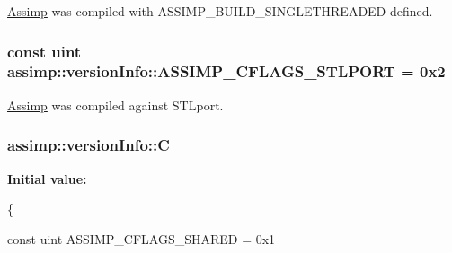 \hyperlink{class_assimp}{Assimp} was compiled with A\+S\+S\+I\+M\+P\+\_\+\+B\+U\+I\+L\+D\+\_\+\+S\+I\+N\+G\+L\+E\+T\+H\+R\+E\+A\+D\+E\+D defined. \hypertarget{namespaceassimp_1_1version_info_a9ff059f28d8b2ae886b672abf7ae0d4b}{
\subsubsection[{A\+S\+S\+I\+M\+P\+\_\+\+C\+F\+L\+A\+G\+S\+\_\+\+S\+T\+L\+P\+O\+R\+T}]{\setlength{\rightskip}{0pt plus 5cm}const uint assimp\+::version\+Info\+::\+A\+S\+S\+I\+M\+P\+\_\+\+C\+F\+L\+A\+G\+S\+\_\+\+S\+T\+L\+P\+O\+R\+T = 0x2}}\label{namespaceassimp_1_1version_info_a9ff059f28d8b2ae886b672abf7ae0d4b}
\hyperlink{class_assimp}{Assimp} was compiled against S\+T\+Lport. \hypertarget{namespaceassimp_1_1version_info_a50775a14d3a0b4265f27f7f32c444b0d}{
\subsubsection[{C}]{\setlength{\rightskip}{0pt plus 5cm}assimp\+::version\+Info\+::\+C}}\label{namespaceassimp_1_1version_info_a50775a14d3a0b4265f27f7f32c444b0d}
{\bfseries Initial value\+:}
\begin{DoxyCode}
\{
   
   \textcolor{keyword}{const} uint ASSIMP\_CFLAGS\_SHARED = 0x1
\end{DoxyCode}
